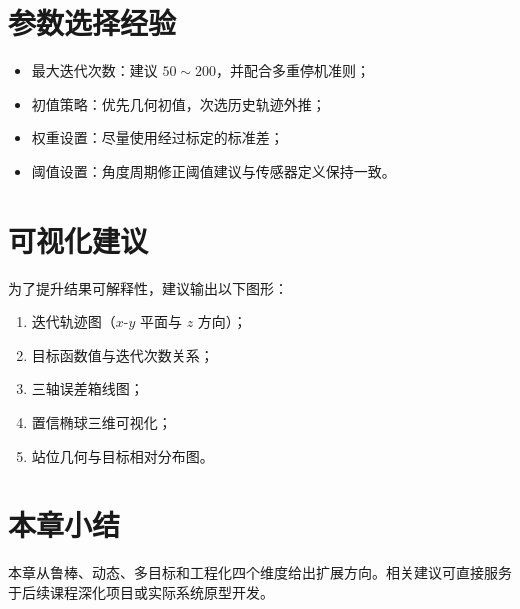 \section{参数选择经验}
\begin{itemize}
  \item 最大迭代次数：建议 $50\sim200$，并配合多重停机准则；
  \item 初值策略：优先几何初值，次选历史轨迹外推；
  \item 权重设置：尽量使用经过标定的标准差；
  \item 阈值设置：角度周期修正阈值建议与传感器定义保持一致。
\end{itemize}

\section{可视化建议}
为了提升结果可解释性，建议输出以下图形：
\begin{enumerate}
  \item 迭代轨迹图（$x$-$y$ 平面与 $z$ 方向）；
  \item 目标函数值与迭代次数关系；
  \item 三轴误差箱线图；
  \item 置信椭球三维可视化；
  \item 站位几何与目标相对分布图。
\end{enumerate}

\section{本章小结}
本章从鲁棒、动态、多目标和工程化四个维度给出扩展方向。相关建议可直接服务于后续课程深化项目或实际系统原型开发。
